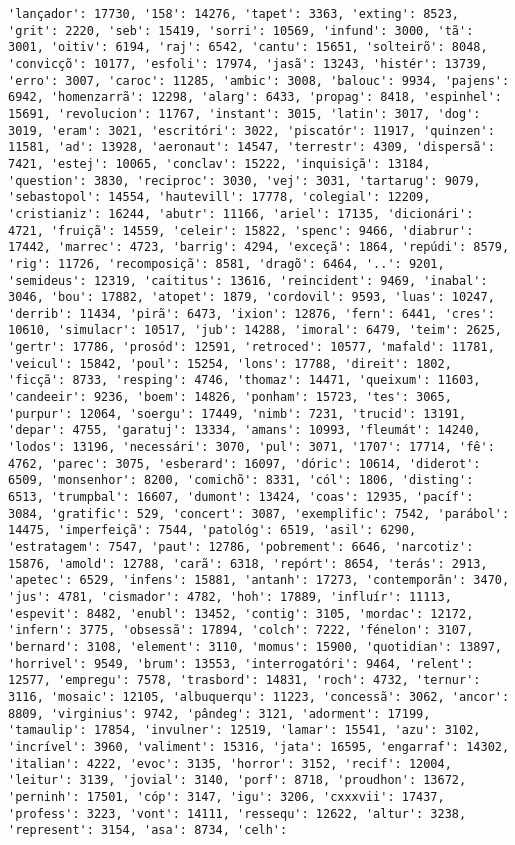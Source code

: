 \documentclass[11pt]{article}
\begin{document}
\begin{Verbatim}[commandchars=\\\{\}]
'lançador': 17730, '158': 14276, 'tapet': 3363, 'exting': 8523, 'grit': 2220, 'seb': 15419, 'sorri': 10569, 'infund': 3000, 'tã': 3001, 'oitiv': 6194, 'raj': 6542, 'cantu': 15651, 'solteirõ': 8048, 'convicçõ': 10177, 'esfoli': 17974, 'jasã': 13243, 'histér': 13739, 'erro': 3007, 'caroc': 11285, 'ambic': 3008, 'balouc': 9934, 'pajens': 6942, 'homenzarrã': 12298, 'alarg': 6433, 'propag': 8418, 'espinhel': 15691, 'revolucion': 11767, 'instant': 3015, 'latin': 3017, 'dog': 3019, 'eram': 3021, 'escritóri': 3022, 'piscatór': 11917, 'quinzen': 11581, 'ad': 13928, 'aeronaut': 14547, 'terrestr': 4309, 'dispersã': 7421, 'estej': 10065, 'conclav': 15222, 'inquisiçã': 13184, 'question': 3830, 'reciproc': 3030, 'vej': 3031, 'tartarug': 9079, 'sebastopol': 14554, 'hautevill': 17778, 'colegial': 12209, 'cristianiz': 16244, 'abutr': 11166, 'ariel': 17135, 'dicionári': 4721, 'fruiçã': 14559, 'celeir': 15822, 'spenc': 9466, 'diabrur': 17442, 'marrec': 4723, 'barrig': 4294, 'exceçã': 1864, 'repúdi': 8579, 'rig': 11726, 'recomposiçã': 8581, 'dragõ': 6464, '..': 9201, 'semideus': 12319, 'caititus': 13616, 'reincident': 9469, 'inabal': 3046, 'bou': 17882, 'atopet': 1879, 'cordovil': 9593, 'luas': 10247, 'derrib': 11434, 'pirã': 6473, 'ixion': 12876, 'fern': 6441, 'cres': 10610, 'simulacr': 10517, 'jub': 14288, 'imoral': 6479, 'teim': 2625, 'gertr': 17786, 'prosód': 12591, 'retroced': 10577, 'mafald': 11781, 'veicul': 15842, 'poul': 15254, 'lons': 17788, 'direit': 1802, 'ficçã': 8733, 'resping': 4746, 'thomaz': 14471, 'queixum': 11603, 'candeeir': 9236, 'boem': 14826, 'ponham': 15723, 'tes': 3065, 'purpur': 12064, 'soergu': 17449, 'nimb': 7231, 'trucid': 13191, 'depar': 4755, 'garatuj': 13334, 'amans': 10993, 'fleumát': 14240, 'lodos': 13196, 'necessári': 3070, 'pul': 3071, '1707': 17714, 'fê': 4762, 'parec': 3075, 'esberard': 16097, 'dóric': 10614, 'diderot': 6509, 'monsenhor': 8200, 'comichõ': 8331, 'cól': 1806, 'disting': 6513, 'trumpbal': 16607, 'dumont': 13424, 'coas': 12935, 'pacíf': 3084, 'gratific': 529, 'concert': 3087, 'exemplific': 7542, 'parábol': 14475, 'imperfeiçã': 7544, 'patológ': 6519, 'asil': 6290, 'estratagem': 7547, 'paut': 12786, 'pobrement': 6646, 'narcotiz': 15876, 'amold': 12788, 'carã': 6318, 'repórt': 8654, 'terás': 2913, 'apetec': 6529, 'infens': 15881, 'antanh': 17273, 'contemporân': 3470, 'jus': 4781, 'cismador': 4782, 'hoh': 17889, 'influír': 11113, 'espevit': 8482, 'enubl': 13452, 'contig': 3105, 'mordac': 12172, 'infern': 3775, 'obsessã': 17894, 'colch': 7222, 'fénelon': 3107, 'bernard': 3108, 'element': 3110, 'momus': 15900, 'quotidian': 13897, 'horrivel': 9549, 'brum': 13553, 'interrogatóri': 9464, 'relent': 12577, 'empregu': 7578, 'trasbord': 14831, 'roch': 4732, 'ternur': 3116, 'mosaic': 12105, 'albuquerqu': 11223, 'concessã': 3062, 'ancor': 8809, 'virginius': 9742, 'pândeg': 3121, 'adorment': 17199, 'tamaulip': 17854, 'invulner': 12519, 'lamar': 15541, 'azu': 3102, 'incrível': 3960, 'valiment': 15316, 'jata': 16595, 'engarraf': 14302, 'italian': 4222, 'evoc': 3135, 'horror': 3152, 'recif': 12004, 'leitur': 3139, 'jovial': 3140, 'porf': 8718, 'proudhon': 13672, 'perninh': 17501, 'cóp': 3147, 'igu': 3206, 'cxxxvii': 17437, 'profess': 3223, 'vont': 14111, 'ressequ': 12622, 'altur': 3238, 'represent': 3154, 'asa': 8734, 'celh': 
\end{Verbatim}
\end{document}
